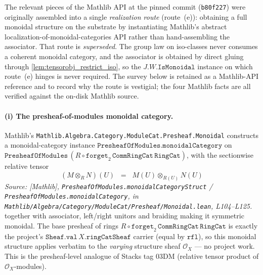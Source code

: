 The relevant pieces of the Mathlib API at the pinned commit
(\texttt{b80f227}) were originally assembled into a single \emph{realization route}
(route~(e)): obtaining a full monoidal structure on the substrate by instantiating
Mathlib's abstract localization-of-monoidal-categories API rather than
hand-assembling the associator. That route is \emph{superseded}. The group law on
iso-classes never consumes a coherent monoidal category, and the associator is
obtained by direct gluing through \cref{lem:tensorobj_restrict_iso}, so the
\(J.W.\mathtt{IsMonoidal}\) instance on which route~(e) hinges is never required.
The survey below is retained as a Mathlib-API reference and to record why the route
is vestigial; the four Mathlib facts are all verified against the on-disk Mathlib
source.

\paragraph{(i) The presheaf-of-modules monoidal category.} Mathlib's
\texttt{Mathlib.Algebra.Category.ModuleCat.Presheaf.Monoidal} constructs a
monoidal-category instance
\(\mathtt{PresheafOfModules.monoidalCategory}\) on
\(\mathtt{PresheafOfModules}\,(R \circ \mathtt{forget}_2\,\mathtt{CommRingCat}\,
\mathtt{RingCat})\), with the sectionwise relative tensor
\[
  (M \otimes_R N)(U) \;\;=\;\; M(U) \otimes_{R(U)} N(U)
\]
\textit{Source: [Mathlib], \texttt{PresheafOfModules.monoidalCategoryStruct} /
\texttt{PresheafOfModules.monoidalCategory}, in
\texttt{Mathlib/Algebra/Category/ModuleCat/Presheaf/Monoidal.lean}, L104--L125.}
together with associator, left/right unitors and braiding making it symmetric
monoidal. The base presheaf of rings \(R \circ \mathtt{forget}_2\,
\mathtt{CommRingCat}\,\mathtt{RingCat}\) is exactly the project's
\(\mathtt{Sheaf.val}\,X.\mathtt{ringCatSheaf}\) carrier (equal by \(\mathtt{rfl}\)),
so this monoidal structure applies verbatim to the \emph{varying} structure sheaf
\(\mathcal{O}_X\) --- no project work. This is the presheaf-level analogue of
Stacks tag 03DM (relative tensor product of \(\mathcal{O}_X\)-modules).

